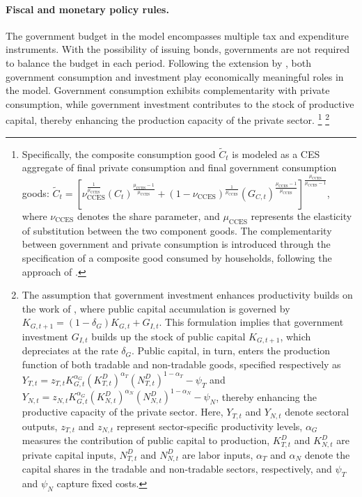 \documentclass[a4paper,11pt]{article}
\numberwithin{equation}{section}
\begin{document}
\paragraph{Fiscal and monetary policy rules.} 
The government budget in the model encompasses multiple tax and expenditure instruments.
With the possibility of issuing bonds, governments are not required to balance the budget in each period.
Following the extension by \citet{Clancyetal2016}, both government consumption and investment play economically meaningful roles in the model.
Government consumption exhibits complementarity with private consumption, while government investment contributes to the stock of productive capital, thereby enhancing the production capacity of the private sector.
\footnote{
    Specifically, the composite consumption good $\tilde{C}_t$ is modeled as a CES aggregate of final private consumption and final government consumption goods: $\tilde{C}_t = \left[\nu_{\text{CCES}}^{\frac{1}{\mu_{\text{CCES}}}}\left(C_t\right)^{\frac{\mu_{\text{CCES}}-1}{\mu_{\text{CCES}}}} + \left(1-\nu_{\text{CCES}}\right)^{\frac{1}{\mu_{\text{CCES}}}}\left(G_{C,t}\right)^{\frac{\mu_{\text{CCES}}-1}{\mu_{\text{CCES}}}}\right]^{\frac{\mu_{\text{CCES}}}{\mu_{\text{CCES}}-1}}$, where $\nu_{\text{CCES}}$ denotes the share parameter, and $\mu_{\text{CCES}}$ represents the elasticity of substitution between the two component goods.
    The complementarity between government and private consumption is introduced through the specification of a composite good consumed by households, following the approach of \citet{Coenen-et-al_AER_2012}.
}
\footnote{
    The assumption that government investment enhances productivity builds on the work of \citet{LeeperEtAl2010jme}, where public capital accumulation is governed by $K_{G,t+1} = (1-\delta_G)K_{G,t} + G_{I,t}$. 
    This formulation implies that government investment $G_{I,t}$ builds up the stock of public capital $K_{G,t+1}$, which depreciates at the rate $\delta_G$. 
    Public capital, in turn, enters the production function of both tradable and non-tradable goods, specified respectively as $Y_{T,t} = z_{T,t} K_{G,t}^{\alpha_G} (K_{T,t}^D)^{\alpha_T} (N_{T,t}^D)^{1-\alpha_T} - \psi_T$ and $Y_{N,t} = z_{N,t} K_{G,t}^{\alpha_G} (K_{N,t}^D)^{\alpha_N} (N_{N,t}^D)^{1-\alpha_N} - \psi_N$, thereby enhancing the productive capacity of the private sector. 
    Here, $Y_{T,t}$ and $Y_{N,t}$ denote sectoral outputs, $z_{T,t}$ and $z_{N,t}$ represent sector-specific productivity levels, $\alpha_G$ measures the contribution of public capital to production, $K_{T,t}^D$ and $K_{N,t}^D$ are private capital inputs, $N_{T,t}^D$ and $N_{N,t}^D$ are labor inputs, $\alpha_T$ and $\alpha_N$ denote the capital shares in the tradable and non-tradable sectors, respectively, and $\psi_T$ and $\psi_N$ capture fixed costs.
}
\end{document}
